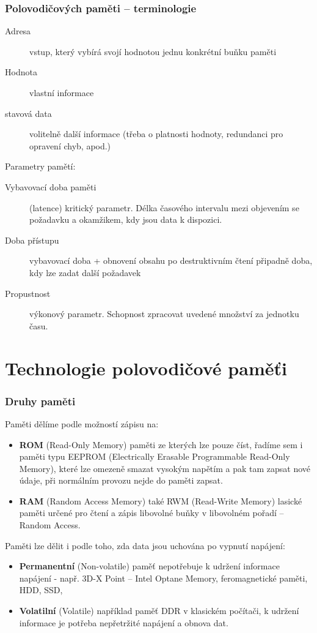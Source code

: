 \documentclass{beamer}
\begin{document}
\begin{frame}
\frametitle{Polovodičových paměti -- terminologie}

\begin{description}
 \item[Adresa] vstup, který vybírá svojí hodnotou jednu konkrétní buňku paměti
 \item[Hodnota] vlastní informace
 \item[stavová data] volitelně další informace (třeba o platnosti hodnoty, redundanci pro opravení chyb, apod.)
\end{description}

Parametry pamětí:

\begin{description}
  \item[Vybavovací doba paměti] (latence) kritický parametr. Délka časového intervalu mezi objevením se požadavku a okamžikem, kdy jsou data k dispozici.
  \item[Doba přístupu] vybavovací doba + obnovení obsahu po destruktivním čtení připadně doba, kdy lze zadat další požadavek
  \item[Propustnost] výkonový parametr. Schopnost zpracovat uvedené množství za jednotku času.
\end{description}

\end{frame}

\section{Technologie polovodičové paměťi}

\begin{frame}
\frametitle{Druhy paměti}

Paměti dělíme podle možností zápisu na:
\begin{itemize}
\item \textbf{ROM} (Read-Only Memory) paměti ze kterých lze pouze číst, řadíme sem i paměti typu EEPROM (Electrically Erasable Programmable Read-Only Memory), které lze omezeně smazat vysokým napětím a pak tam zapsat nové údaje, při normálním provozu nejde do paměti zapsat.
\item \textbf{RAM} (Random Access Memory) také RWM (Read-Write Memory) lasické paměti určené pro čtení a zápis libovolné buňky v libovolném pořadí -- Random Access.
\end{itemize}

Paměti lze dělit i podle toho, zda data jsou uchována po vypnutí napájení:
\begin{itemize}
\item \textbf{Permanentní} (Non-volatile) paměť nepotřebuje k udržení informace napájení - např. 3D-X Point -- Intel Optane Memory, feromagnetické paměti, HDD, SSD, 
\item \textbf{Volatilní} (Volatile) například paměť DDR v klasickém počítači, k udržení informace je potřeba nepřetržité napájení a obnova dat.
\end{itemize}
\end{frame}
\end{document}

